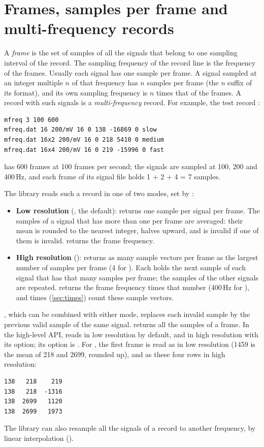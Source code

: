 \section{Frames, samples per frame and multi-frequency records}
\label{sec:frames}

A \emph{frame} is the set of samples of all the signals that belong to one
sampling interval of the record. The sampling frequency of the record line
is the frequency of the frames. Usually each signal has one sample per
frame. A signal sampled at an integer multiple $n$ of that frequency has
$n$ samples per frame (the \emph{n} suffix of its format), and its
own sampling frequency is $n$ times that of the frames. A record with such
signals is a \emph{multi-frequency} record. For example, the test record
:
\begin{lstlisting}[style=text]
mfreq 3 100 600
mfreq.dat 16 200/mV 16 0 138 -16869 0 slow
mfreq.dat 16x2 200/mV 16 0 218 5410 0 medium
mfreq.dat 16x4 200/mV 16 0 219 -15996 0 fast
\end{lstlisting}
has 600 frames at 100 frames per second; the signals are sampled at 100,
200 and 400\,Hz, and each frame of its signal file holds 1 + 2 + 4 = 7
samples.

The library reads such a record in one of two modes, set by
:
\begin{itemize}
\item \textbf{Low resolution} (, the default):
   returns one sample per signal per frame. The samples of a
  signal that has more than one per frame are averaged: their mean is
  rounded to the nearest integer, halves upward, and is invalid if one of
  them is invalid.  returns the frame frequency.
\item \textbf{High resolution} (): 
  returns as many sample vectors per frame as the largest number of samples
  per frame (4 for ). Each holds the next sample of each signal
  that has that many samples per frame; the samples of the other signals
  are repeated.  returns the frame frequency times that
  number (400\,Hz for ), and times (\cref{sec:times}) count
  these sample vectors.
\end{itemize}
, which can be combined with either mode, replaces each
invalid sample by the previous valid sample of the same signal.
 returns all the samples of a frame. In the high-level API,
 reads in low resolution by default, and in high
resolution with its  option; its  option is
. For , the first frame is read as
 in low resolution (1459 is the mean of 218 and 2699,
rounded up), and as these four rows in high resolution:
\begin{lstlisting}[style=text]
138   218    219
138   218  -1316
138  2699   1120
138  2699   1973
\end{lstlisting}
The library can also resample all the signals of a record to another
frequency, by linear interpolation ().

